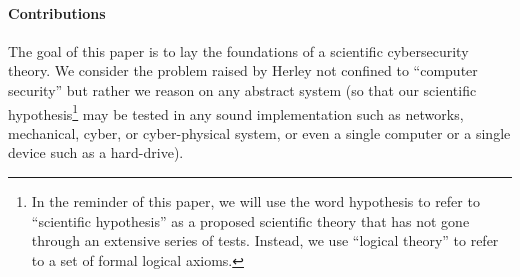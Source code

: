 \documentclass[conference]{IEEEtran}
\begin{document}
\paragraph{Contributions} 
The goal of this paper is to lay the foundations of a scientific cybersecurity
theory.  We consider the problem raised by Herley not confined to ``computer
security'' but rather we reason on any abstract system (so that our scientific
hypothesis\footnote{In the reminder of this paper, we will use the word
hypothesis to refer to ``scientific hypothesis'' as a proposed scientific
theory that has not gone through an extensive series of tests. Instead, we
use ``logical theory'' to refer to a set of formal logical axioms.} may
be tested in any sound implementation such as networks, mechanical, cyber, or
cyber-physical system, or even a single computer or a single device such as a
hard-drive).  
\end{document}
